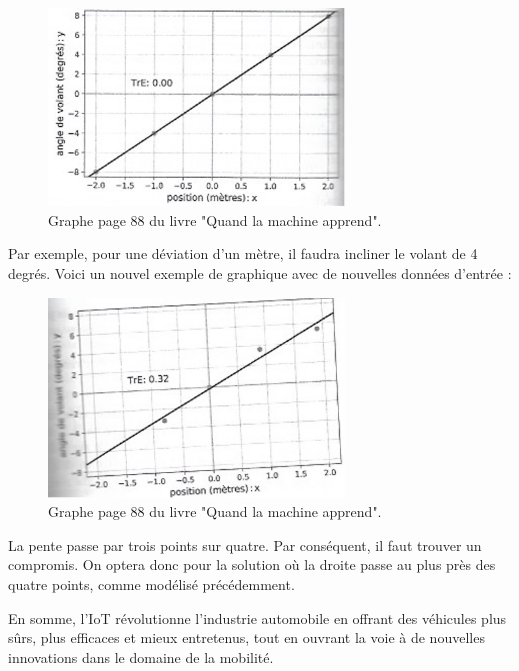 \begin{figure}[h]
    \centering
    \includegraphics[width=0.7\textwidth]{images/graph1_yannLeCun.png} 
    \caption{Graphe page 88 du livre "Quand la machine apprend".}
\end{figure}

Par exemple, pour une déviation d’un mètre, il faudra incliner le volant de 4 degrés. 
Voici un nouvel exemple de graphique avec de nouvelles données d’entrée :

\begin{figure}[h]
    \centering
    \includegraphics[width=0.7\textwidth]{images/graph2_yannLeCun.jpg} 
    \caption{Graphe page 88 du livre "Quand la machine apprend".}
\end{figure}

La pente passe par trois points sur quatre. Par conséquent, il faut trouver un compromis. On optera donc pour la solution où la droite passe au plus près des quatre points, comme modélisé précédemment. 




En somme, l’IoT révolutionne l’industrie automobile en offrant des véhicules plus sûrs, plus efficaces et mieux entretenus, tout en ouvrant la voie à de nouvelles innovations dans le domaine de la mobilité.


